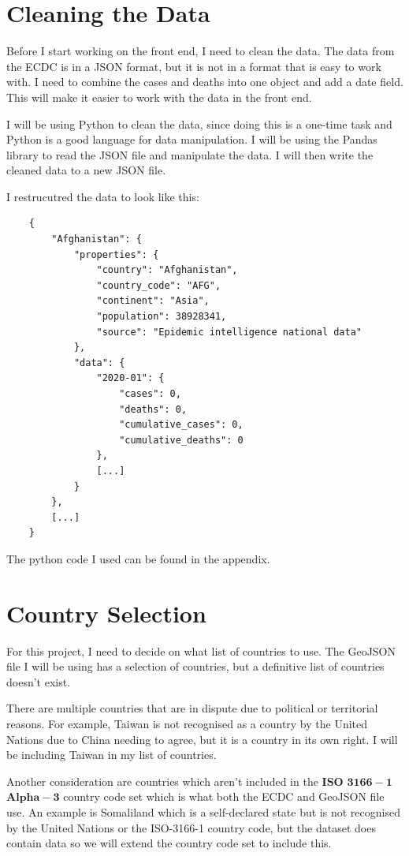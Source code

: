 \documentclass{report}
\begin{document}
\section{Cleaning the Data}
Before I start working on the front end, I need to clean the data. The data from the ECDC is in a JSON format, but it is not in a format that is easy to work with. I need to combine the cases and deaths into one object and add a date field. This will make it easier to work with the data in the front end.

I will be using Python to clean the data, since doing this is a one-time task and Python is a good language for data manipulation. I will be using the Pandas library to read the JSON file and manipulate the data. I will then write the cleaned data to a new JSON file.

I restrucutred the data to look like this:
\begin{center}
    \begin{lstlisting}
    {
        "Afghanistan": {
            "properties": {
                "country": "Afghanistan",
                "country_code": "AFG",
                "continent": "Asia",
                "population": 38928341,
                "source": "Epidemic intelligence national data"
            },
            "data": {
                "2020-01": {
                    "cases": 0,
                    "deaths": 0,
                    "cumulative_cases": 0,
                    "cumulative_deaths": 0
                },
                [...]
            }
        },
        [...]
    }
    \end{lstlisting}
\end{center}
The python code I used can be found in the appendix.

\section{Country Selection}
For this project, I need to decide on what list of countries to use. The GeoJSON file I will be using has a selection of countries, but a definitive list of countries doesn't exist.

There are multiple countries that are in dispute due to political or territorial reasons. For example, Taiwan is not recognised as a country by the United Nations due to China needing to agree, but it is a country in its own right. I will be including Taiwan in my list of countries.

Another consideration are countries which aren't included in the $\mathbf{ISO}$ $\mathbf{3166-1}$ $\mathbf{Alpha-3}$ country code set which is what both the ECDC and GeoJSON file use. An example is Somaliland which is a self-declared state but is not recognised by the United Nations or the ISO-3166-1 country code, but the dataset does contain data so we will extend the country code set to include this.
\end{document}
